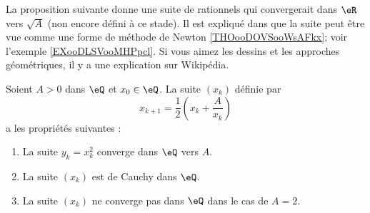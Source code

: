 La proposition suivante donne une suite de rationnels qui convergerait dans \( \eR\) vers \( \sqrt{ A }\) (non encore défini à ce stade). Il est expliqué dans \cite{BIBooMPXEooQLKhku} que la suite peut être vue comme une forme de méthode de Newton \ref{THOooDOVSooWsAFkx}; voir l'exemple \ref{EXooDLSVooMHPpcl}. Si vous aimez les dessins et les approches géométriques, il y a une explication sur Wikipédia\cite{BIBooVCWCooQcolIq}.
\begin{proposition}       \label{PROPooSTQXooHlIGVf}
	Soient \( A>0\) dans \( \eQ\) et \( x_0\in \eQ\). La suite \( (x_k)\) définie par
	\begin{equation}        \label{EQooOUIVooUqWhXe}
		x_{k+1}=\frac{ 1 }{2}\left( x_k+\frac{ A }{ x_k } \right)
	\end{equation}
	a les propriétés suivantes :
	\begin{enumerate}
		\item
		      La suite \( y_k=x_k^2 \) converge dans \( \eQ\) vers \( A\).
		\item
		      La suite \( (x_k)\) est de Cauchy dans \( \eQ\).
		\item
		      La suite \( (x_k)\) ne converge pas dans \( \eQ\) dans le cas de \( A=2\).
	\end{enumerate}
\end{proposition}

